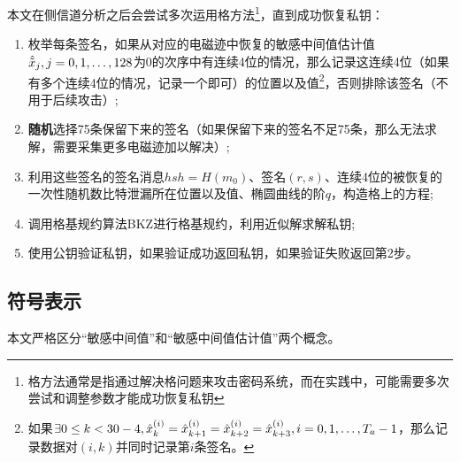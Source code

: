 {	%
	本文在侧信道分析之后会尝试多次运用格方法\footnote{格方法通常是指通过解决格问题来攻击密码系统，而在实践中，可能需要多次尝试和调整参数才能成功恢复私钥}，直到成功恢复私钥：
	
	\begin{enumerate}
		\item 枚举每条签名，如果从对应的电磁迹中恢复的敏感中间值估计值$\hat{\tilde {x}}_j,j=0,1,\dots,128$为0的次序中有连续4位的情况，那么记录这连续4位（如果有多个连续4位的情况，记录一个即可）的位置以及值\footnote{如果$\exists 0\le k<30-4,\hat{x}^{(i)}_k=\hat{x}^{(i)}_{k+1}=\hat{x}^{(i)}_{k+2}=\hat{x}^{(i)}_{k+3},i=0,1,\dots,T_a-1$，那么记录数据对$(i,k)$并同时记录第$i$条签名。}，否则排除该签名（不用于后续攻击）;
		\item \textbf{随机}选择75条保留下来的签名（如果保留下来的签名不足75条，那么无法求解，需要采集更多电磁迹加以解决）;
		\item 利用这些签名的签名消息$hsh=H(m_0)$、签名$(r,s)$、连续4位的被恢复的一次性随机数比特泄漏所在位置以及值、椭圆曲线的阶$q$，构造格上的方程;
		\item 调用格基规约算法BKZ\citep{Schnorr91}进行格基规约，利用近似解求解私钥;
		\item 使用公钥验证私钥，如果验证成功返回私钥，如果验证失败返回第2步。
	\end{enumerate}

	\subsection{符号表示}\label{subs:ecdsasymbol}
	
	本文严格区分“敏感中间值”和“敏感中间值估计值”两个概念。%
	
}
